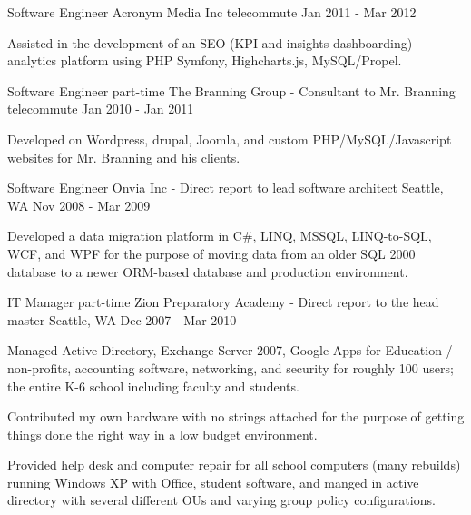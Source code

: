 \begin{cventries}
    \cventry
    {Software Engineer}
    {Acronym Media Inc}
    {telecommute}
    {Jan 2011 - Mar 2012}
    {
        \begin{cvitems}
        \item {Assisted in the development of an SEO (KPI and insights dashboarding) analytics platform using PHP Symfony, Highcharts.js, MySQL/Propel.}
        \end{cvitems}
    }

    \cventry
    {Software Engineer part-time}
    {The Branning Group - Consultant to Mr. Branning}
    {telecommute}
    {Jan 2010 - Jan 2011}
    {
        \begin{cvitems}
        \item {Developed on Wordpress, drupal, Joomla, and custom PHP/MySQL/Javascript websites for Mr. Branning and his clients.}
        \end{cvitems}
    }

    \cventry
    {Software Engineer}
    {Onvia Inc - Direct report to lead software architect}
    {Seattle, WA}
    {Nov 2008 - Mar 2009}
    {
        \begin{cvitems}
        \item {Developed a data migration platform in C\#, LINQ, MSSQL, LINQ-to-SQL, WCF, and WPF for the purpose of moving data from an older SQL 2000 database to a newer ORM-based database and production environment.}
        \end{cvitems}
    }

    \cventry
    {IT Manager part-time} 
    {Zion Preparatory Academy - Direct report to the head master} 
    {Seattle, WA} 
    {Dec 2007 - Mar 2010} 
    { 
        \begin{cvitems}
        \item {Managed Active Directory, Exchange Server 2007, Google Apps for Education / non-profits, accounting software, networking, and security for roughly 100 users; the entire K-6 school including faculty and students.}
        \item {Contributed my own hardware with no strings attached for the purpose of getting things done the right way in a low budget environment.}
        \item {Provided help desk and computer repair for all school computers (many rebuilds) running Windows XP with Office, student software, and manged in active directory with several different OUs and varying group policy configurations.}
        \end{cvitems}
    }


\end{cventries}

